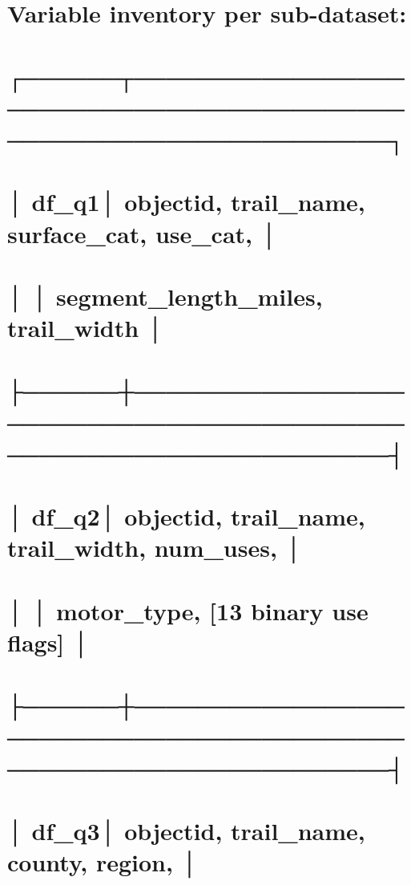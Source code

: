 \documentclass[
]{article}
\begin{document}
\section{Variable inventory per
sub-dataset:}\label{variable-inventory-per-sub-dataset}

\section{┌──────┬──────────────────────────────────────────────────────────────────┐}\label{section-2}

\section{│ df\_q1│ objectid, trail\_name, surface\_cat, use\_cat,
│}\label{df_q1-objectid-trail_name-surface_cat-use_cat}

\section{│ │ segment\_length\_miles, trail\_width
│}\label{segment_length_miles-trail_width}

\section{├──────┼──────────────────────────────────────────────────────────────────┤}\label{section-3}

\section{│ df\_q2│ objectid, trail\_name, trail\_width, num\_uses,
│}\label{df_q2-objectid-trail_name-trail_width-num_uses}

\section{│ │ motor\_type, {[}13 binary use flags{]}
│}\label{motor_type-13-binary-use-flags}

\section{├──────┼──────────────────────────────────────────────────────────────────┤}\label{section-4}

\section{│ df\_q3│ objectid, trail\_name, county, region,
│}\label{df_q3-objectid-trail_name-county-region}
\end{document}
